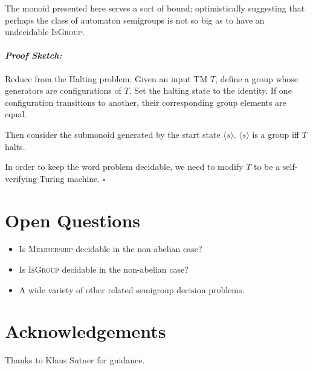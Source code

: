\documentclass[a0]{a0poster}
\newcommand{\decprob}[1]{\textsc{#1}}
\theoremstyle{pleasant}
\newenvironment{proofsketch}{\paragraph{\large \normalfont \textit{Proof Sketch:}}}{\hfill$\square$}
\newcommand{\0}{\underline{0}}
\newcommand{\1}{\underline{1}}
\newcommand{\2}{\underline{2}}
\begin{document}
\begin{multicols}{3}
The monoid presented here serves a sort of bound; optimistically
suggesting that perhaps the class of automaton semigroups is not so
big as to have an undecidable \decprob{IsGroup}.

\begin{proofsketch}
  Reduce from the Halting problem. Given an input TM $T$, define a
  group whose generators are configurations of $T$. Set the halting
  state to the identity. If one configuration transitions to another,
  their corresponding group elements are equal.

  Then consider the submonoid generated by the start state
  $\langle s \rangle$. $\langle s \rangle$ is a group iff $T$ halts.

  In order to keep the word problem decidable, we need to modify $T$
  to be a self-verifying Turing machine.
\end{proofsketch}

\section*{Open Questions}

\begin{itemize}
\item Is \textsc{Membership} decidable in the non-abelian case?
\item Is \textsc{IsGroup} decidable in the non-abelian case?
\item A wide variety of other related semigroup decision problems.
\end{itemize}

\section*{Acknowledgements}

Thanks to Klaus Sutner for guidance.

\end{multicols}
\end{document}
